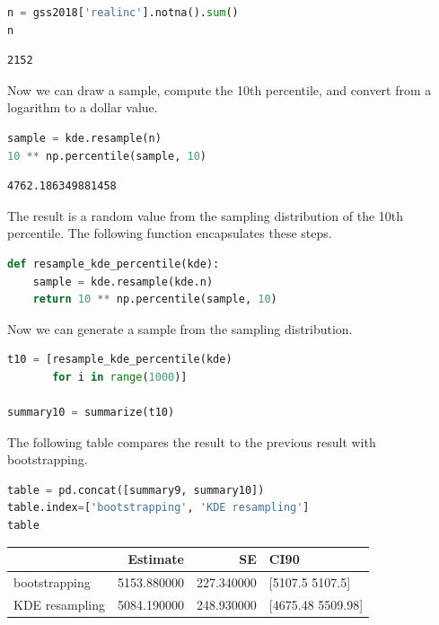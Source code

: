 \begin{lstlisting}[language=Python,style=source]
n = gss2018['realinc'].notna().sum()
n
\end{lstlisting}

\begin{lstlisting}[style=output]
2152
\end{lstlisting}

Now we can draw a sample, compute the 10th percentile, and convert from
a logarithm to a dollar value.

\begin{lstlisting}[language=Python,style=source]
sample = kde.resample(n)
10 ** np.percentile(sample, 10)
\end{lstlisting}

\begin{lstlisting}[style=output]
4762.186349881458
\end{lstlisting}

The result is a random value from the sampling distribution of the 10th
percentile. The following function encapsulates these steps.

\begin{lstlisting}[language=Python,style=source]
def resample_kde_percentile(kde):
    sample = kde.resample(kde.n)
    return 10 ** np.percentile(sample, 10)
\end{lstlisting}

Now we can generate a sample from the sampling distribution.

\begin{lstlisting}[language=Python,style=source]
t10 = [resample_kde_percentile(kde)
       for i in range(1000)]

summary10 = summarize(t10)
\end{lstlisting}

The following table compares the result to the previous result with
bootstrapping.

\begin{lstlisting}[language=Python,style=source]
table = pd.concat([summary9, summary10])
table.index=['bootstrapping', 'KDE resampling']
table
\end{lstlisting}

\begin{tabular}{lrrl}
\midrule
 & Estimate & SE & CI90 \\
\midrule
bootstrapping & 5153.880000 & 227.340000 & [5107.5 5107.5] \\
KDE resampling & 5084.190000 & 248.930000 & [4675.48 5509.98] \\
\midrule
\end{tabular}

